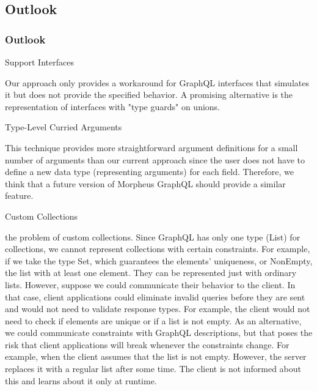   

\subsection{Outlook}
\begin{frame}\frametitle{Outlook}

\begin{block}{Support Interfaces}

Our approach only provides a workaround for GraphQL interfaces that simulates it but does not provide the specified behavior. A promising alternative is the representation of interfaces with "type guards" on unions. 

\end{block}

\begin{block}{Type-Level Curried Arguments}

This technique provides more straightforward argument definitions for a small number of arguments than our current approach since the user does not have to define a new data type (representing arguments) for each field. Therefore, we think that a future version of Morpheus GraphQL should provide a similar feature. 

\end{block}

\begin{block}{Custom Collections}

the problem of custom collections. Since GraphQL has only one type (List) for collections, we cannot represent collections with certain constraints. For example, if we take the type Set, which guarantees the elements' uniqueness, or NonEmpty, the list with at least one element. They can be represented just with ordinary lists.  However, suppose we could communicate their behavior to the client. In that case, client applications could eliminate invalid queries before they are sent and would not need to validate response types. For example, the client would not need to check if elements are unique or if a list is not empty.  As an alternative, we could communicate constraints with GraphQL descriptions, but that poses the risk that client applications will break whenever the constraints change. For example, when the client assumes that the list is not empty. However, the server replaces it with a regular list after some time. The client is not informed about this and learns about it only at runtime.

\end{block}


\end{frame}
